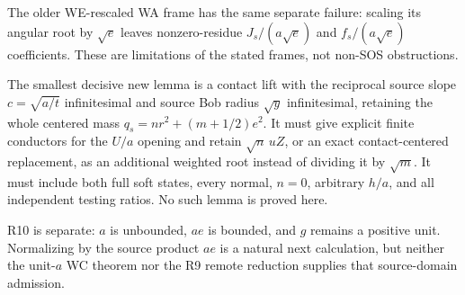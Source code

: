 The older WE-rescaled WA frame has the same separate failure:
scaling its angular root by $\sqrt e$ leaves nonzero-residue
$J_s/(a\sqrt e)$ and $f_s/(a\sqrt e)$ coefficients. These are
limitations of the stated frames, not non-SOS obstructions.

The smallest decisive new lemma is a contact lift with the
reciprocal source slope $c=\sqrt{a/t}$ infinitesimal and source
Bob radius $\sqrt y$ infinitesimal, retaining the whole centered
mass $q_s=nr^2+(m+1/2)e^2$. It must give explicit finite conductors
for the $U/a$ opening and retain $\sqrt n\,uZ$, or an exact
contact-centered replacement, as an additional weighted root
instead of dividing it by $\sqrt m$. It must include both full
soft states, every normal, $n=0$, arbitrary $h/a$, and all
independent testing ratios. No such lemma is proved here.

R10 is separate: $a$ is unbounded, $ae$ is bounded, and $g$ remains
a positive unit. Normalizing by the source product $ae$ is a
natural next calculation, but neither the unit-$a$ WC theorem nor
the R9 remote reduction supplies that source-domain admission.
